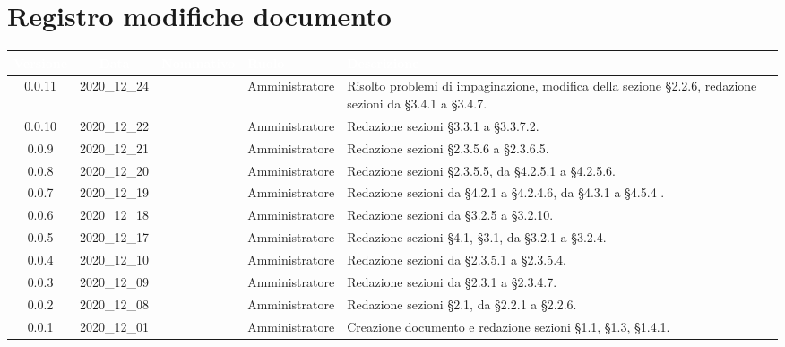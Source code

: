 \section*{Registro modifiche documento}
{
\renewcommand{\arraystretch}{1.5}
\centering
\begin{longtable}{ c c  C{2.3cm} C{3cm} C{3.2cm}}


 \textcolor{white}{\textbf{Versione}}&
    \textcolor{white}{\textbf{Data}}&
    \textcolor{white}{\textbf{Nominativo}}&
    \textcolor{white}{\textbf{Ruolo}}&
    \textcolor{white}{\textbf{Descrizione}}\\	
    \endhead
    
     0.0.11 & 2020\_12\_24 & \TG{}  & Amministratore & Risolto problemi di impaginazione, modifica della sezione \S2.2.6, redazione sezioni da \S3.4.1 a \S3.4.7. \\
    
     0.0.10 & 2020\_12\_22 & \TG{}  & Amministratore & Redazione sezioni \S3.3.1 a \S3.3.7.2. \\
    
    0.0.9 & 2020\_12\_21 & \TG{}  & Amministratore & Redazione sezioni \S2.3.5.6 a \S2.3.6.5. \\
    
    0.0.8 & 2020\_12\_20 & \TG{}  & Amministratore & Redazione sezioni \S2.3.5.5, da \S4.2.5.1 a \S4.2.5.6. \\
    
     0.0.7 & 2020\_12\_19 & \TG{}  & Amministratore & Redazione sezioni da \S4.2.1 a \S4.2.4.6, da \S4.3.1 a \S4.5.4 . \\
    
    0.0.6 & 2020\_12\_18 & \TG{}  & Amministratore & Redazione sezioni da \S3.2.5 a \S3.2.10. \\
    
    0.0.5 & 2020\_12\_17 & \TG{} & Amministratore  & Redazione sezioni \S4.1, \S3.1, da \S3.2.1 a \S3.2.4. \\
    
     0.0.4 & 2020\_12\_10 & \TG{} & Amministratore  & Redazione sezioni da \S2.3.5.1 a \S2.3.5.4. \\
    
     0.0.3 & 2020\_12\_09 & \TG{} & Amministratore  & Redazione sezioni da \S2.3.1 a \S2.3.4.7.  \\
     
     0.0.2 & 2020\_12\_08 & \TG{} & Amministratore  & Redazione sezioni \S2.1, da \S2.2.1 a \S2.2.6.  \\      
            
    0.0.1 & 2020\_12\_01 & \TG{} & Amministratore  & Creazione documento e redazione sezioni \S1.1, \S1.3, \S1.4.1.  \\
			
\end{longtable}
}